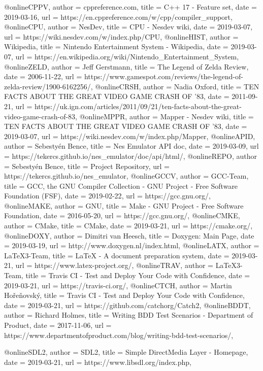@online{CPPV,
	author = {cppreference.com},
	title = {C++ 17 - Feature set},
	date = {2019-03-16},
	url = {https://en.cppreference.com/w/cpp/compiler_support},
}
@online{CPU,
	author = {NesDev},
	title = {CPU - Nesdev wiki},
	date = {2019-03-07},
	url = {https://wiki.nesdev.com/w/index.php/CPU},
}
@online{HIST,
	author = {Wikipedia},
	title = {Nintendo Entertainment System - Wikipedia},
	date = {2019-03-07},
	url = {https://en.wikipedia.org/wiki/Nintendo_Entertainment_System},
}
@online{ZELD,
	author = {Jeff Gerstmann},
	title = {The Legend of Zelda Review},
	date = {2006-11-22},
	url = {https://www.gamespot.com/reviews/the-legend-of-zelda-review/1900-6162256/},
}
@online{CRSH,
	author = {Nadia Oxford},
	title = {TEN FACTS ABOUT THE GREAT VIDEO GAME CRASH OF '83},
	date = {2011-09-21},
	url = {https://uk.ign.com/articles/2011/09/21/ten-facts-about-the-great-video-game-crash-of-83},
}
@online{MPPR,
	author = {Mapper - Nesdev wiki},
	title = {TEN FACTS ABOUT THE GREAT VIDEO GAME CRASH OF '83},
	date = {2019-03-07},
	url = {https://wiki.nesdev.com/w/index.php/Mapper},
}
@online{APID,
	author = {Sebestyén Bence},
	title = {Nes Emulator API doc},
	date = {2019-03-09},
	url = {https://tekercs.github.io/nes_emulator/doc/api/html/},
}
@online{REPO,
	author = {Sebestyén Bence},
	title = {Project Repository},
	url = {https://tekercs.github.io/nes_emulator},
}
@online{GCCV,
	author = {GCC-Team},
	title = {GCC, the GNU Compiler Collection - GNU Project - Free Software Foundation (FSF)},
	date = {2019-02-22},
	url = {https://gcc.gnu.org/},
}
@online{MAKE,
	author = {GNU},
	title = {Make - GNU Project - Free Software Foundation},
	date = {2016-05-20},
	url = {https://gcc.gnu.org/},
}
@online{CMKE,
	author = {CMake},
	title = {CMake},
	date = {2019-03-21},
	url = {https://cmake.org/},
}
@online{DOXY,
	author = {Dimitri van Heesch},
	title = {Doxygen: Main Page},
	date = {2019-03-19},
	url = {http://www.doxygen.nl/index.html},
}
@online{LATX,
	author = {LaTeX3-Team},
	title = {LaTeX - A document preparation system},
	date = {2019-03-21},
	url = {https://www.latex-project.org/},
}
@online{TRAV,
	author = {LaTeX3-Team},
	title = {Travis CI - Test and Deploy Your Code with Confidence},
	date = {2019-03-21},
	url = {https://travis-ci.org/},
}
@online{CTCH,
	author = {Martin Hořeňovský},
	title = {Travis CI - Test and Deploy Your Code with Confidence},
	date = {2019-03-21},
	url = {https://github.com/catchorg/Catch2},
}
@online{BDDT,
	author = {Richard Holmes},
	title = {Writing BDD Test Scenarios - Department of Product},
	date = {2017-11-06},
	url = {https://www.departmentofproduct.com/blog/writing-bdd-test-scenarios/},
}

@online{SDL2,
	author = {SDL2},
	title = {Simple DirectMedia Layer - Homepage},
	date = {2019-03-21},
	url = {https://www.libsdl.org/index.php},
}


